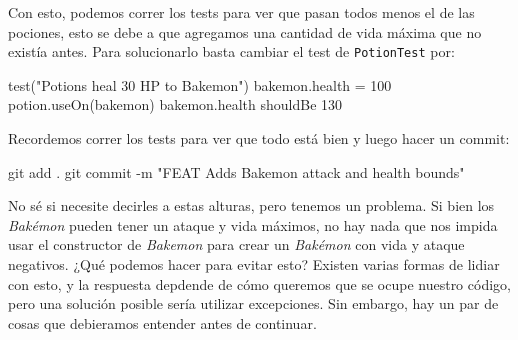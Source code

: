   Con esto, podemos correr los tests para ver que pasan todos menos el de las pociones, esto se debe
  a que agregamos una cantidad de vida máxima que no existía antes.
  Para solucionarlo basta cambiar el test de \texttt{PotionTest} por:

  \begin{kotlin}
    test("Potions heal 30 HP to Bakemon") {
      bakemon.health = 100
      potion.useOn(bakemon)
      bakemon.health shouldBe 130
    }
  \end{kotlin}

  Recordemos correr los tests para ver que todo está bien y luego hacer un commit:

  \begin{powershell}
    git add .
    git commit -m "FEAT Adds Bakemon attack and health bounds"
  \end{powershell}

  No sé si necesite decirles a estas alturas, pero tenemos un problema.
  Si bien los \textit{Bakémon} pueden tener un ataque y vida máximos, no hay nada que nos impida
  usar el constructor de \textit{Bakemon} para crear un \textit{Bakémon} con vida y ataque
  negativos.
  ¿Qué podemos hacer para evitar esto?
  Existen varias formas de lidiar con esto, y la respuesta depdende de cómo queremos que se ocupe
  nuestro código, pero una solución posible sería utilizar excepciones.
  Sin embargo, hay un par de cosas que debieramos entender antes de continuar.
